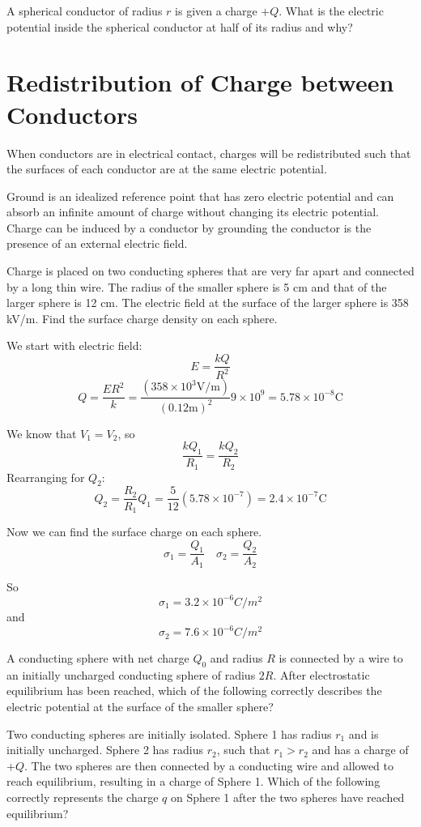\documentclass[../em.tex]{subfiles}
\begin{document}
\ex A spherical conductor of radius $r$ is given a charge $+Q$. What is the electric potential inside the spherical conductor at half of its radius and why?

\section{Redistribution of Charge between Conductors}
When conductors are in electrical contact, charges will be redistributed such that the surfaces of each conductor are at the same electric potential.

Ground is an idealized reference point that has zero electric potential and can absorb an 
infinite amount of charge without changing its electric potential. Charge can be induced by a conductor by grounding the conductor is the presence of an external electric field.
\begin{example}
    Charge is placed on two conducting spheres that are very far apart and connected by a long thin wire. 
    The radius of the smaller sphere is 5 cm and that of the larger sphere is 12 cm. The electric field at the 
    surface of the larger sphere is 358 kV/m. Find the surface charge density on each sphere.

    We start with electric field:
    \[E = \frac{kQ}{R^2}\] 
    \[Q = \frac{ER^2}{k}=\frac{(358\times 10^3 \text{V/m})}{(0.12\text{m})^2}{9\times 10^9}= 5.78\times 10^{-8}\text{C}\]

    We know that $V_1 = V_2$, so 
    \[\frac{kQ_1}{R_1}=\frac{kQ_2}{R_2}\] 
    Rearranging for $Q_2$:
    \[Q_2=\frac{R_2}{R_1}Q_1 = \frac{5}{12}(5.78\times10^{-7})=2.4\times10^{-7}\text{C}\]

    Now we can find the surface charge on each sphere. 
    \[\sigma_1=\frac{Q_1}{A_1} \quad \sigma_2 = \frac{Q_2}{A_2}\]

    So \[\sigma_1 = 3.2\times 10^{-6} C/m^2\]
    and \[\sigma_2 = 7.6\times 10^{-6} C/m^2\] 
\end{example}

\ex A conducting sphere with net charge $Q_0$ and radius $R$ is connected by a wire to an initially uncharged conducting sphere of radius $2R$. After electrostatic equilibrium has been reached, which of the following correctly describes the electric potential at the surface of the smaller sphere?

\ex Two conducting spheres are initially isolated. Sphere 1 has radius $r_1$ and is initially uncharged. Sphere 2 has radius $r_2$, such that $r_1>r_2$ and has a charge of $+Q$. The two spheres are then connected 
by a conducting wire and allowed to reach equilibrium, resulting in a charge of Sphere 1. Which of the following correctly represents the charge $q$ on Sphere 1 after the two spheres have reached equilibrium?
\end{document}
